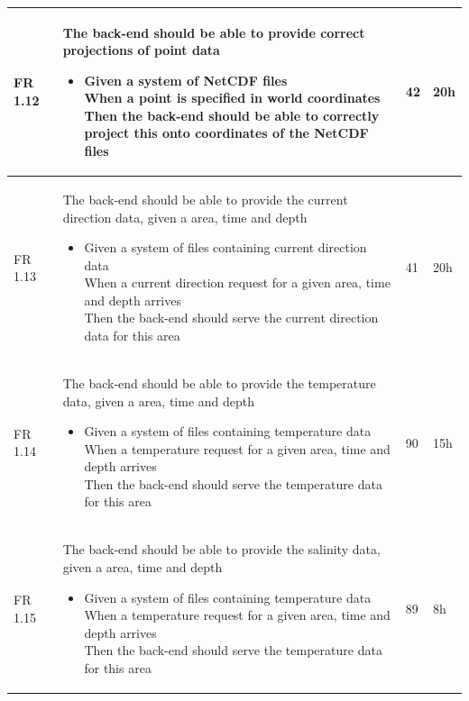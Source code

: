 \documentclass[11pt,a4paper,titlepage,oneside]{report}
\begin{document}
\begin{longtable}{p{1.4cm} p{7.8cm} p{1cm} p{1cm} }
  FR 1.12 & The back-end should be able to provide correct projections of point data
  \begin{itemize}
  \item \parbox[t]{6.8cm}{
        Given a system of NetCDF files \\
        When a point is specified in world coordinates \\
        Then the back-end should be able to correctly project this onto coordinates of the NetCDF files}
  \end{itemize}
  & 42 & 20h \\ \hline

  FR 1.13 & The back-end should be able to provide the current direction data, given a area, time and depth
  \begin{itemize}
  \item \parbox[t]{6.8cm}{
        Given a system of files containing current direction data \\
        When a current direction request for a given area, time and depth arrives \\
        Then the back-end should serve the current direction data for this area}
  \end{itemize}
  & 41 & 20h \\ \hline

  FR 1.14 & The back-end should be able to provide the temperature data, given a area, time and depth
  \begin{itemize}
  \item \parbox[t]{6.8cm}{
        Given a system of files containing temperature data \\
        When a temperature request for a given area, time and depth arrives \\
        Then the back-end should serve the temperature data for this area}
  \end{itemize}
  & 90 & 15h \\ \hline

  FR 1.15 & The back-end should be able to provide the salinity data, given a area, time and depth
  \begin{itemize}
  \item \parbox[t]{6.8cm}{
        Given a system of files containing temperature data \\
        When a temperature request for a given area, time and depth arrives \\
        Then the back-end should serve the temperature data for this area}
  \end{itemize}
  & 89 & 8h \\ \hline


\end{longtable}
\end{document}
